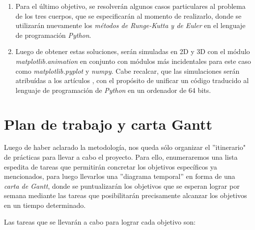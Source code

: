 \documentclass[proyecto.tex]{subfiles}
\begin{document}
\begin{enumerate}
\item Para el último objetivo, se resolverán algunos casos particulares al problema de los tres cuerpos, que se especificarán al momento de realizarlo, donde se utilizarán nuevamente los \textit{métodos de Runge-Kutta y de Euler} en el lenguaje de programación \textit{Python}. 
\item Luego de obtener estas soluciones, serán simuladas en 2D y 3D con el módulo \textit{matplotlib.animation} en conjunto con módulos más incidentales para este caso como \textit{matplotlib.pyplot} y \textit{numpy}. Cabe recalcar, que las simulaciones serán atribuídas a los artículos \cite{Musielak_2014,simulation3d,Iker_2017}, con el propósito de unificar un código traducido al lenguaje de programación de \textit{Python} en un ordenador de 64 bits.
\end{enumerate}

\section{Plan de trabajo y carta Gantt}

\par Luego de haber aclarado la metodología, nos queda sólo organizar el ''itinerario" de prácticas para llevar a cabo el proyecto. Para ello, enumeraremos una lista espedita de tareas que permitirán concretar los objetivos específicos ya mencionados, para luego llevarlos una ''diagrama temporal'' en forma de una \textit{carta de Gantt}, donde se puntualizarán los objetivos que se esperan lograr por semana mediante las tareas que posibilitarán precisamente alcanzar los objetivos en un tiempo determinado. 

\par Las tareas que se llevarán a cabo para lograr cada objetivo son:
\end{document}
